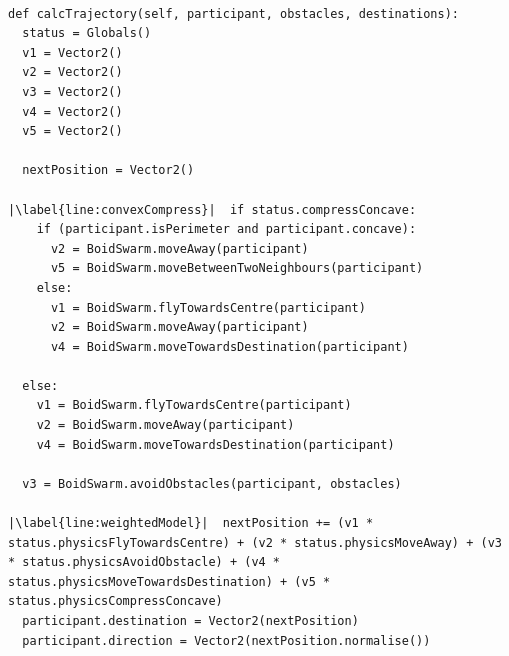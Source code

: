 \lstset{language=Python,
basicstyle=\tiny,
numbers=left, 
numberstyle=\tiny,
captionpos=b,
frame=single,
breaklines=true,
caption=Agent trajectory code,
escapechar=|
} %
\begin{lstlisting}[label={code:worldPhysics1}]  % Start your code-block

def calcTrajectory(self, participant, obstacles, destinations):
  status = Globals()
  v1 = Vector2()
  v2 = Vector2()
  v3 = Vector2()
  v4 = Vector2()
  v5 = Vector2()

  nextPosition = Vector2()
        
|\label{line:convexCompress}|  if status.compressConcave:
    if (participant.isPerimeter and participant.concave):
      v2 = BoidSwarm.moveAway(participant)
      v5 = BoidSwarm.moveBetweenTwoNeighbours(participant)
    else:
      v1 = BoidSwarm.flyTowardsCentre(participant)
      v2 = BoidSwarm.moveAway(participant)
      v4 = BoidSwarm.moveTowardsDestination(participant)

  else:
    v1 = BoidSwarm.flyTowardsCentre(participant)            
    v2 = BoidSwarm.moveAway(participant)
    v4 = BoidSwarm.moveTowardsDestination(participant)

  v3 = BoidSwarm.avoidObstacles(participant, obstacles)

|\label{line:weightedModel}|  nextPosition += (v1 * status.physicsFlyTowardsCentre) + (v2 * status.physicsMoveAway) + (v3 * status.physicsAvoidObstacle) + (v4 * status.physicsMoveTowardsDestination) + (v5 * status.physicsCompressConcave)
  participant.destination = Vector2(nextPosition)
  participant.direction = Vector2(nextPosition.normalise())
\end{lstlisting}

